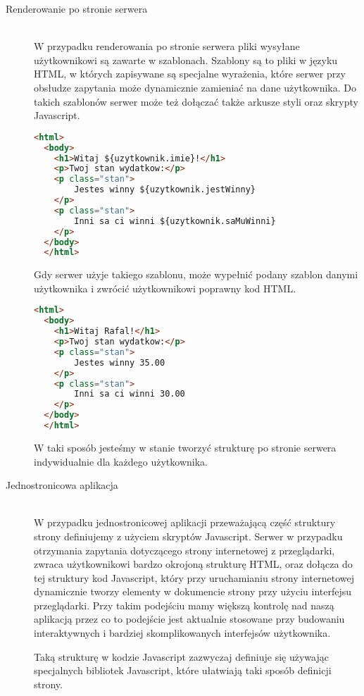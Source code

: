 \begin{description}
  \item[Renderowanie po stronie serwera] \hfill \\ W przypadku renderowania po stronie serwera pliki wysyłane użytkownikowi są zawarte w szablonach. Szablony są to pliki w języku HTML, w których zapisywane są specjalne wyrażenia, które serwer przy obsłudze zapytania może dynamicznie zamieniać na dane użytkownika. Do takich szablonów serwer może też dołączać także arkusze styli oraz skrypty Javascript.
  \begin{lstlisting}[language=HTML, caption=Przykład szablonu w Freemaker]
  <html>
  <body>
    <h1>Witaj ${uzytkownik.imie}!</h1>
    <p>Twoj stan wydatkow:</p>
    <p class="stan">
        Jestes winny ${uzytkownik.jestWinny}
    </p>
    <p class="stan">
        Inni sa ci winni ${uzytkownik.saMuWinni}
    </p>
  </body>
  </html>
  \end{lstlisting}

  Gdy serwer użyje takiego szablonu, może wypełnić podany szablon danymi użytkownika i zwrócić użytkownikowi poprawny kod HTML.

  \begin{lstlisting}[language=HTML, caption=Przykład szablonu w Freemaker]
  <html>
  <body>
    <h1>Witaj Rafal!</h1>
    <p>Twoj stan wydatkow:</p>
    <p class="stan">
        Jestes winny 35.00
    </p>
    <p class="stan">
        Inni sa ci winni 30.00
    </p>
  </body>
  </html>
  \end{lstlisting}
  W taki sposób jesteśmy w stanie tworzyć strukturę po stronie serwera indywidualnie dla każdego użytkownika.

  \item[Jednostronicowa aplikacja] \hfill \\ W przypadku jednostronicowej aplikacji przeważającą część struktury strony definiujemy z użyciem skryptów Javascript. Serwer w przypadku otrzymania zapytania dotyczącego strony internetowej z przeglądarki, zwraca użytkownikowi bardzo okrojoną strukturę HTML, oraz dołącza do tej struktury kod Javascript, który przy uruchamianiu strony internetowej dynamicznie tworzy elementy w dokumencie strony przy użyciu interfejsu przeglądarki. Przy takim podejściu mamy większą kontrolę nad naszą aplikacją przez co to podejście jest aktualnie stosowane przy budowaniu interaktywnych i bardziej skomplikowanych interfejsów użytkownika.

  Taką strukturę w kodzie Javascript zazwyczaj definiuje się używając specjalnych bibliotek Javascript, które ułatwiają taki sposób definicji strony.


\end{description}
